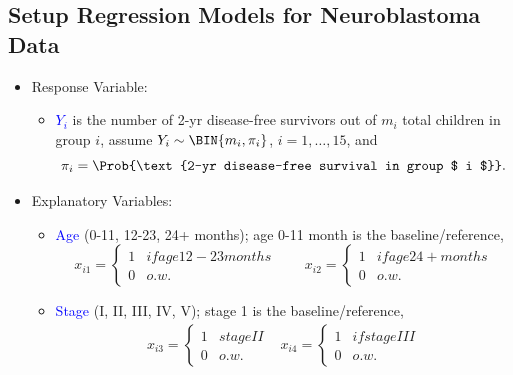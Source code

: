 \documentclass[oneside]{book}\usepackage[]{graphicx}\usepackage[svgnames]{xcolor}
\begin{document}
\subsection*{Setup Regression Models for Neuroblastoma Data}
\begin{itemize}
    \item Response Variable:
          \begin{itemize}
              \item \textcolor{Blue}{$ Y_i $} is the number of 2-yr disease-free survivors out of $ m_i $ total children in
                    group $ i $, assume $ Y_i \sim \BIN{m_i,\pi_i} $, $ i=1,\ldots,15 $, and
                    \[ \pi_i=\Prob{\text{2-yr disease-free survival in group $ i $}}. \]
          \end{itemize}
    \item Explanatory Variables:
          \begin{itemize}
              \item \textcolor{Blue}{Age} (0-11, 12-23, 24+ months); age 0-11 month is the baseline/reference,
                    \[ x_{i1}  = \begin{cases*}
                            1 & if age 12-23 months \\
                            0 & o.w.
                        \end{cases*} \qquad
                        x_{i2}  = \begin{cases*}
                            1 & if age 24+ months \\
                            0 & o.w.
                        \end{cases*} \]
              \item \textcolor{Blue}{Stage} (I, II, III, IV, V); stage 1 is the baseline/reference,
                    \[ \begin{array}{ll}
                            x_{i3} = \begin{cases*}
                                         1 & stage II \\
                                         0 & o.w.
                                     \end{cases*}  &
                            x_{i4}  = \begin{cases*}
                                          1 & if stage III \\
                                          0 & o.w.
                                      \end{cases*} \\

\end{array}\]
\end{itemize}
\end{itemize}
\end{document}
